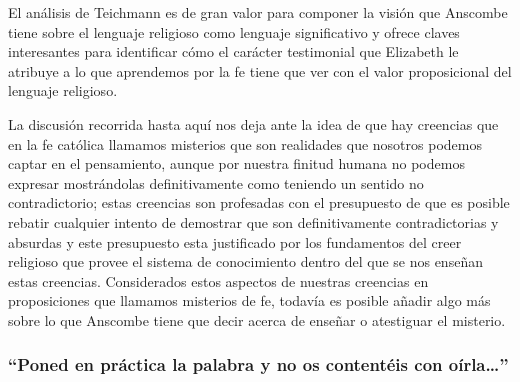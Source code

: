 El análisis de Teichmann es de gran valor para componer la visión que Anscombe tiene sobre el lenguaje religioso como lenguaje significativo y ofrece claves interesantes para identificar cómo el carácter testimonial que Elizabeth le atribuye a lo que aprendemos por la fe tiene que ver con el valor proposicional del lenguaje religioso.

La discusión recorrida hasta aquí nos deja ante la idea de que hay creencias que en la fe católica llamamos misterios que son realidades que nosotros podemos captar en el pensamiento, aunque por nuestra finitud humana no podemos expresar mostrándolas definitivamente como teniendo un sentido no contradictorio; estas creencias son profesadas con el presupuesto de que es posible rebatir cualquier intento de demostrar que son definitivamente contradictorias y absurdas y este presupuesto esta justificado por los fundamentos del creer religioso que provee el sistema de conocimiento dentro del que se nos enseñan estas creencias. Considerados estos aspectos de nuestras creencias en proposiciones que llamamos misterios de fe, todavía es posible añadir algo más sobre lo que Anscombe tiene que decir acerca de enseñar o atestiguar el misterio.

\subsubsection{\enquote{Poned en práctica la palabra y no os contentéis con oírla\ldots}}

